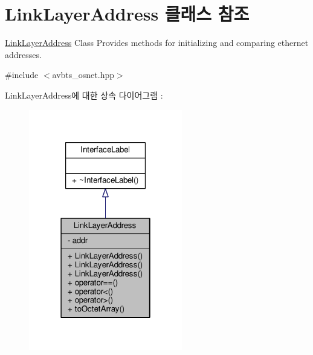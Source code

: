 \hypertarget{class_link_layer_address}{}\section{Link\+Layer\+Address 클래스 참조}
\label{class_link_layer_address}


\hyperlink{class_link_layer_address}{Link\+Layer\+Address} Class Provides methods for initializing and comparing ethernet addresses.  




{\ttfamily \#include $<$avbts\+\_\+osnet.\+hpp$>$}



Link\+Layer\+Address에 대한 상속 다이어그램 \+: 
\nopagebreak
\begin{figure}[H]
\begin{center}
\leavevmode
\includegraphics[width=190pt]{class_link_layer_address__inherit__graph}
\end{center}
\end{figure}


